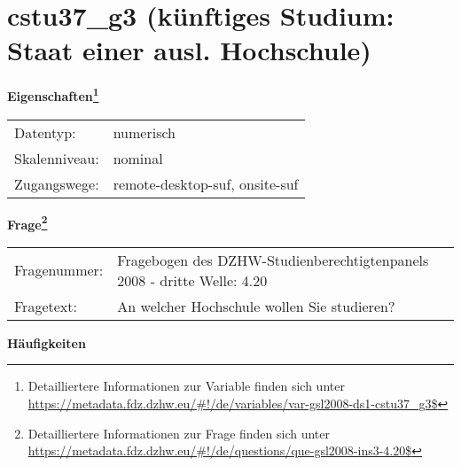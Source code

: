 
    \setcounter{footnote}{0}

    \vspace*{-1.8cm}
	\section{cstu37\_g3 (künftiges Studium: Staat einer ausl. Hochschule)}
	\label{section:cstu37_g3}



    \vspace*{0.5cm}
    \noindent\textbf{Eigenschaften\footnote{Detailliertere Informationen zur Variable finden sich unter
		\url{https://metadata.fdz.dzhw.eu/\#!/de/variables/var-gsl2008-ds1-cstu37_g3$}}}\\
	\begin{tabularx}{\hsize}{@{}lX}
	Datentyp: & numerisch \\
	Skalenniveau: & nominal \\
	Zugangswege: &
	  remote-desktop-suf, 
	  onsite-suf
 \\
    \end{tabularx}



				\vspace*{0.5cm}
                \noindent\textbf{Frage\footnote{Detailliertere Informationen zur Frage finden sich unter
		              \url{https://metadata.fdz.dzhw.eu/\#!/de/questions/que-gsl2008-ins3-4.20$}}}\\
				\begin{tabularx}{\hsize}{@{}lX}
					Fragenummer: &
					  Fragebogen des DZHW-Studienberechtigtenpanels 2008 - dritte Welle:
					  4.20
 \\
					Fragetext: & An welcher Hochschule wollen Sie studieren? \\
				\end{tabularx}





        		\vspace*{0.5cm}
                \noindent\textbf{Häufigkeiten}

